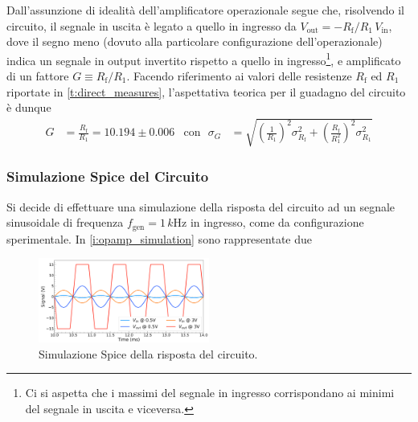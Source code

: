 \documentclass[a4paper,11pt]{article} %
\begin{document}
\noindent Dall'assunzione di idealità dell'amplificatore operazionale segue che, risolvendo il circuito, il segnale in
uscita è legato a quello in ingresso da $V_{\text{out}} = - R_{\text{f}} / R_{1} \, V_{\text{in}}$, dove il segno meno
(dovuto alla particolare configurazione dell'operazionale) indica un segnale in output invertito rispetto a quello in
ingresso\footnote{Ci si aspetta che i massimi del segnale in ingresso corrispondano ai minimi del segnale in uscita e
viceversa.}, e amplificato di un fattore $G \equiv R_{\text{f}} / R_{1}$. Facendo riferimento ai valori delle resistenze
$R_{\text{f}}$ ed $R_1$ riportate in \autoref{t:direct_measures}, l'aspettativa teorica per il guadagno del circuito è
dunque 
\begin{align}\label{e:guadagno}
	G&=\frac{R_{\text{f}}}{R_{1}} = 10.194 \pm 0.006
	&
	\text{con   }\,\,\sigma_{G}&=\sqrt{	\left(	\frac{	1	}{	R_{1}	}	\right)^2	\sigma_{R_{\text{f}}}^2	
	+	\left(	\frac{	R_{\text{f}}	}{	R_{1}^2	}	\right)^2\sigma_{R_{1}}^2	}
\end{align}


\subsubsection{Simulazione Spice del Circuito}\label{s:spice} 

Si decide di effettuare una simulazione della risposta del circuito ad un segnale sinusoidale di frequenza
$f_{\text{gen}}=1\,\si{k\hertz}$ in ingresso, come da configurazione sperimentale. In \autoref{i:opamp_simulation} sono
rappresentate due 

\begin{figure}
	\centering
	\includegraphics[width=0.5\textwidth]{../Plots/Report_Plots/opamp_spice_py.png}
	\caption{\footnotesize Simulazione Spice della risposta del circuito.}
	\label{i:opamp_simulation}
\end{figure}
\end{document}
